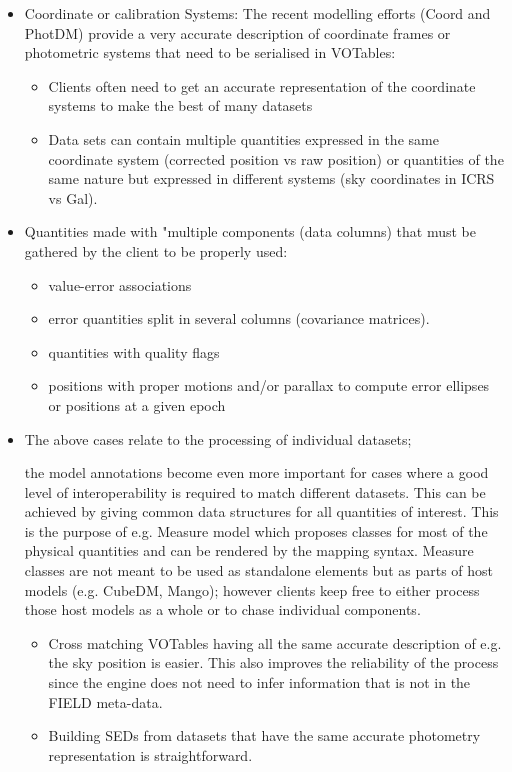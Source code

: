 \begin{itemize}
  \item Coordinate or calibration Systems: The recent modelling efforts (Coord and PhotDM) provide a very accurate description of coordinate frames or photometric systems that need to be serialised in VOTables:
  \begin{itemize}
    \item Clients often need to get an accurate representation of the coordinate systems to make the best of many datasets  
    \item Data sets can contain multiple quantities expressed in the same coordinate system (corrected position vs raw position) or 
             quantities of the same nature but expressed in different systems (sky coordinates in ICRS vs Gal). %
  \end{itemize} 
  
  \item Quantities made with "multiple components (data columns) that must be gathered by the client to be properly used:
  \begin{itemize}
    \item value-error associations
    \item error quantities split in several columns (covariance matrices). 
    \item quantities with quality flags
    \item positions with proper motions and/or parallax to compute error ellipses or positions at a given epoch
  \end{itemize} 

  \item The above cases relate to the processing of individual datasets; 
  
  the model annotations become even more important for cases where a good level of interoperability is required to match different datasets. 
           This can be achieved by giving  common data structures for all quantities of interest. This is the purpose of e.g. Measure model which proposes classes for 
           most of the physical quantities and can be rendered by the mapping syntax. Measure classes are not meant to be used as standalone elements but as parts of host models (e.g. CubeDM, Mango);
           however clients keep free to either process those host models as a whole or to chase individual components.
    \begin{itemize}
      \item Cross matching VOTables having all the same accurate description of e.g. the sky position is easier. %
               This also improves the reliability of the process since the engine does not need to infer information that is not in the FIELD meta-data.
      \item Building SEDs from datasets that have the same accurate photometry representation is straightforward.
   \end{itemize}          


\end{itemize}
